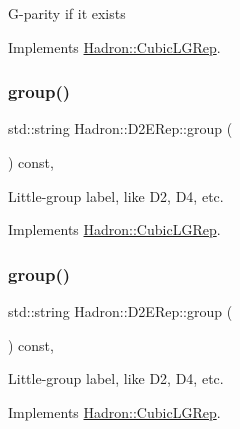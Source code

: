 G-\/parity if it exists 

Implements \mbox{\hyperlink{structHadron_1_1CubicLGRep_ace26f7b2d55e3a668a14cb9026da5231}{Hadron\+::\+Cubic\+L\+G\+Rep}}.

\mbox{\label{structHadron_1_1D2ERep_a7a2b734e04205943bbaa64c4b26147c9}} 
\subsubsection{\texorpdfstring{group()}{group()}\hspace{0.1cm}{\footnotesize\ttfamily [1/5]}}
{\footnotesize\ttfamily std\+::string Hadron\+::\+D2\+E\+Rep\+::group (\begin{DoxyParamCaption}{ }\end{DoxyParamCaption}) const\hspace{0.3cm}{\ttfamily [inline]}, {\ttfamily [virtual]}}

Little-\/group label, like D2, D4, etc. 

Implements \mbox{\hyperlink{structHadron_1_1CubicLGRep_a9bdb14b519a611d21379ed96a3a9eb41}{Hadron\+::\+Cubic\+L\+G\+Rep}}.

\mbox{\label{structHadron_1_1D2ERep_a7a2b734e04205943bbaa64c4b26147c9}} 
\subsubsection{\texorpdfstring{group()}{group()}\hspace{0.1cm}{\footnotesize\ttfamily [2/5]}}
{\footnotesize\ttfamily std\+::string Hadron\+::\+D2\+E\+Rep\+::group (\begin{DoxyParamCaption}{ }\end{DoxyParamCaption}) const\hspace{0.3cm}{\ttfamily [inline]}, {\ttfamily [virtual]}}

Little-\/group label, like D2, D4, etc. 

Implements \mbox{\hyperlink{structHadron_1_1CubicLGRep_a9bdb14b519a611d21379ed96a3a9eb41}{Hadron\+::\+Cubic\+L\+G\+Rep}}.

\mbox{\label{structHadron_1_1D2ERep_a7a2b734e04205943bbaa64c4b26147c9}} 
